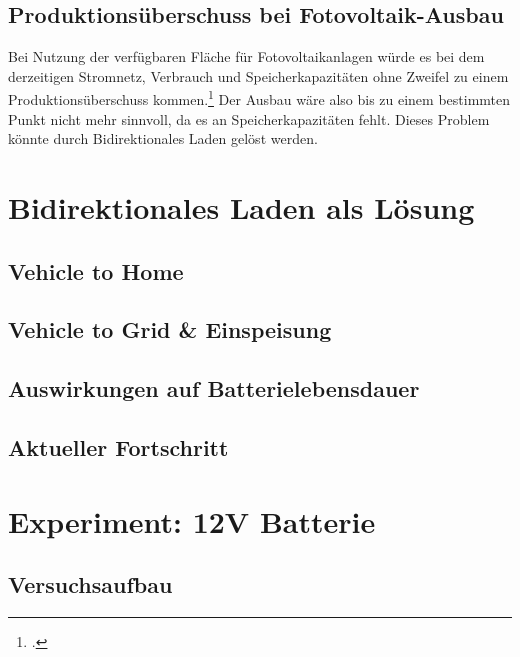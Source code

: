 \documentclass[12pt, ngerman]{article}
\begin{document}
\subsection{Produktionsüberschuss bei Fotovoltaik-Ausbau}
Bei Nutzung der verfügbaren Fläche für Fotovoltaikanlagen würde es bei dem derzeitigen Stromnetz, Verbrauch und
Speicherkapazitäten ohne Zweifel zu einem Produktionsüberschuss kommen.\footcite{wirthAktuelleFaktenZur}
Der Ausbau wäre also bis zu einem bestimmten Punkt nicht mehr sinnvoll, da es an Speicherkapazitäten fehlt.
Dieses Problem könnte durch Bidirektionales Laden gelöst werden.


\section{Bidirektionales Laden als Lösung}

\subsection{Vehicle to Home}

\subsection{Vehicle to Grid \& Einspeisung}

\subsection{Auswirkungen auf Batterielebensdauer}

\subsection{Aktueller Fortschritt}


\section{Experiment: 12V Batterie}

\subsection{Versuchsaufbau}
\end{document}
